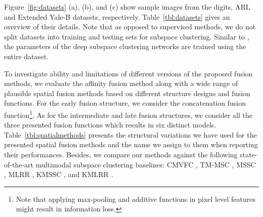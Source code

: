\documentclass[journal]{IEEEtran}
\begin{document}
		 Figure~\ref{fig:datasets} (a), (b), and (c) show sample images from the digits, ARL and Extended Yale-B datasets, respectively. Table~\ref{tbl:datasets} gives an overview of their details. Note that as opposed to supervised methods, we do not split datasets into training and testing sets for subspace clustering. Similar to \cite{deepsc17nips}, the parameters of the deep subspace clustering networks are trained using the entire dataset. 

\begin{table}[t]
\begin{center}
\caption{Details of the multimodal datasets that are used in the experiments. Note that as opposed to supervised methods, we do not split datasets to training and testing sets in a deep subspace clustering task. } \label{tbl:datasets}
\end{center}
\end{table}		   


To investigate ability and limitations of different versions of the proposed fusion methods,  we evaluate the affinity fusion method along with a wide range of plausible spatial fusion methods based on different structure designs and fusion functions.		    For the early fusion structure, we consider the concatenation fusion function\footnote{Note that applying max-pooling and additive functions in pixel level features might result in information loss.}. 		 As for the intermediate and late fusion structures, we consider all the three presented fusion functions which results in six distinct models. Table~\ref{tbl:spatialmethods} presents the structural variations we have used for the presented spatial fusion methods and the name we assign to them when reporting their performances.	   Besides,  we compare our methods against the following state-of-the-art multimodal subspace clustering baselines: CMVFC \cite{cao2015constrained}, TM-MSC \cite{zhang2015low},  MSSC \cite{abavisani2018multimodal}, MLRR \cite{abavisani2018multimodal}, KMSSC \cite{abavisani2018multimodal}, and KMLRR \cite{abavisani2018multimodal}. 
\end{document}
